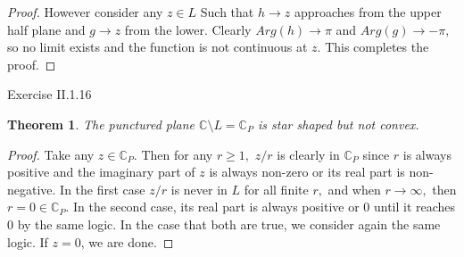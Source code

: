 \documentclass[letter]{article}
\newtheorem{theorem}{Theorem}
\newenvironment{menumerate}{%
  \edef\backupindent{\the\parindent}%
  \enumerate%
  \setlength{\parindent}{\backupindent}%
}{\endenumerate}
\begin{document}
\begin{menumerate}
\begin{proof}
		However consider any $z \in L$ Such that $h \to z$ approaches from the upper half plane and $g \to z$ from the lower. Clearly $Arg(h) \to \pi$ and $Arg(g) \to -\pi,$ so no limit exists and the function is not continuous at $z.$ This completes the proof.
	\end{proof}

	\item Exercise II.1.16
	\begin{theorem}
		The punctured plane $\mathbb{C} \setminus L = \mathbb{C}_P$ is star shaped but not convex.
	\end{theorem}
	\begin{proof}
		Take any $z \in \mathbb{C}_P.$ Then for any $r \geq 1,$ $z/r$ is
		clearly in $\mathbb{C}_P$ since $r$ is always positive and the imaginary part of $z$ is always non-zero or its real 
		part is non-negative. In the first case $z/r$ is never in $L$ for all finite $r,$ and when $r \to \infty,$ then $r = 0 \in \mathbb{C}_P.$  In the second case, its real part is always positive or $0$ until it reaches $0$ by the same logic. In the case that both are true, we consider again the same logic. If $z = 0$, we are done.


\end{proof}
\end{menumerate}
\end{document}
